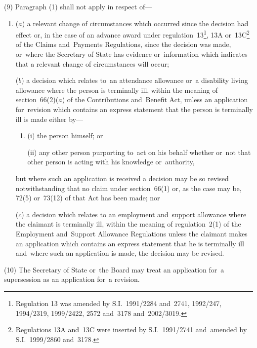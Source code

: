 \documentclass[12pt,a4paper]{article}
\begin{document}
(9) Paragraph (1) shall not apply in respect of—
\begin{enumerate}\item[]
($a$) a relevant change of circumstances which occurred since the decision 
had effect  %
or, in the case of an advance award under regulation~13\footnote{Regulation 13 was amended by S.I.~1991/2284 and~2741, 1992/247, 1994/2319, 1999/2422, 2572 and~3178 and~2002/3019.}, 13A or~13C\footnote{Regulations 13A and~13C were inserted by S.I.~1991/2741 and~amended by S.I.~1999/2860 and~3178.} of the Claims and~Payments Regulations, since the decision was made,  %
or~where the Secretary of State has evidence or~information which indicates that a relevant change of circumstances will occur; 

($b$) a decision which relates to~an attendance allowance or~a disability living allowance where the person is terminally ill, within the meaning of section~66(2)($a$) of the Contributions and~Benefit Act, unless an application for~revision which contains an express statement that the person is terminally ill is made either by—
\begin{enumerate}\item[]
(i) the person himself; or

(ii) any other person purporting to~act on his behalf whether or~not that other person is acting with his knowledge or~authority,
\end{enumerate}
but where such an application is received a decision may be so revised notwithstanding that no claim under section~66(1) or, as the case may be, 72(5) or~73(12) of that Act has been made;
%
nor

($c$) a decision which relates to an employment and~support allowance where the claimant is terminally ill, within the meaning of regulation~2(1) of the Employment and~Support Allowance Regulations unless the claimant makes an application which contains an express statement that he is terminally ill and~where such an application is made, the decision may be revised.
\end{enumerate}

(10) The Secretary of State 
or~the Board  %
may treat an application for~a supersession as an application for~a revision.
\end{document}
